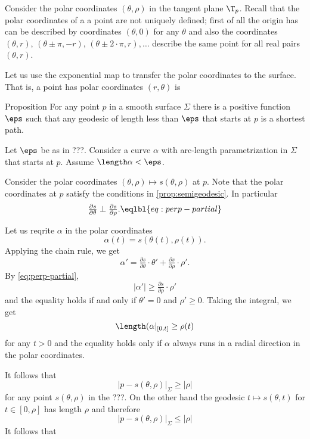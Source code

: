 Consider the polar coordinates $(\theta,\rho)$ in the tangent plane $\T_p$.
Recall that the polar coordinates of a a point are not uniquely defined;
first of all the origin has can be described by coordinates $(\theta,0)$ for any $\theta$ and also 
the coordinates $(\theta,r)$, $(\theta\pm\pi,-r)$, $(\theta\pm2\cdot \pi,r),\dots$ describe the same point for all real pairs $(\theta,r)$.

Let us use the exponential map to transfer the polar coordinates to the surface.
That is, a point has polar coordinates $(r,\theta)$ is 

\begin{thm}{Proposition}
For any point $p$ in a smooth surface $\Sigma$ there is a positive function $\eps$
such that any geodesic of length less than $\eps$ that starts at $p$ is a shortest path.  
\end{thm}

 Let $\eps$ be as in ???.
Consider a curve $\alpha$ with arc-length parametrization in $\Sigma$ that starts at $p$.
Assume $\length\alpha<\eps$.

Consider the polar coordinates $(\theta,\rho)\mapsto s(\theta,\rho)$ at $p$.
Note that the polar coordinates at $p$ satisfy the conditions in \ref{prop:semigeodesic}.
In particular
\[\tfrac{\partial s}{\partial\theta}\perp\tfrac{\partial s}{\partial\rho}.\eqlbl{eq:perp-partial}\]

Let us reqrite $\alpha$ in the polar coordinates 
\[\alpha(t)=s(\theta(t),\rho(t)).\]
Applying the chain rule, we get 
\[\alpha'=\tfrac{\partial s}{\partial\theta}\cdot\theta'+\tfrac{\partial s}{\partial\rho}\cdot\rho'.\]
By \ref{eq:perp-partial}, 
\[|\alpha'|\ge \tfrac{\partial s}{\partial\rho}\cdot\rho'\]
and the equality holds if and only if $\theta'=0$ and $\rho'\ge 0$.
Taking the integral, we get 
\[\length(\alpha|_{[0,t]}\ge\rho(t)\]
for any $t>0$ and the equality holds only if $\alpha$ always runs in a radial direction in the polar coordinates.

It follows that 
\[|p-s(\theta,\rho)|_\Sigma\ge |\rho|\]
for any point $s(\theta,\rho)$ in the ???.
On the other hand the geodesic $t\mapsto s(\theta,t)$ for $t\in[0,\rho]$ has length $\rho$ and therefore 
\[|p-s(\theta,\rho)|_\Sigma\le |\rho|\]
It follows that 



